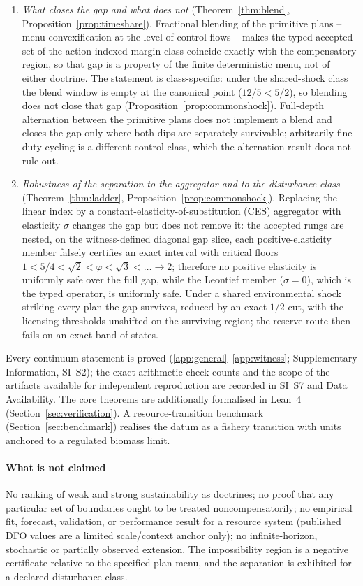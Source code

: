 \documentclass[preprint,11pt,authoryear]{elsarticle}
\theoremstyle{definition}
\theoremstyle{remark}
\begin{document}
\begin{enumerate}[leftmargin=2em,label=(\roman*)]
\item \emph{What closes the gap and what does not} (Theorem~\ref{thm:blend}, Proposition~\ref{prop:timeshare}). Fractional blending of the primitive plans -- menu convexification at the level of control flows -- makes the typed accepted set of the action-indexed margin class coincide exactly with the compensatory region, so that gap is a property of the finite deterministic menu, not of either doctrine. The statement is class-specific: under the shared-shock class the blend window is empty at the canonical point ($12/5<5/2$), so blending does not close that gap (Proposition~\ref{prop:commonshock}). Full-depth alternation between the primitive plans does not implement a blend and closes the gap only where both dips are separately survivable; arbitrarily fine duty cycling is a different control class, which the alternation result does not rule out.
\item \emph{Robustness of the separation to the aggregator and to the disturbance class} (Theorem~\ref{thm:ladder}, Proposition~\ref{prop:commonshock}). Replacing the linear index by a constant-elasticity-of-substitution (CES) aggregator with elasticity $\sigma$ changes the gap but does not remove it: the accepted rungs are nested, on the witness-defined diagonal gap slice, each positive-elasticity member falsely certifies an exact interval with critical floors $1<5/4<\sqrt2<\varphi<\sqrt3<\dots\to2$; therefore no positive elasticity is uniformly safe over the full gap, while the Leontief member ($\sigma=0$), which is the typed operator, is uniformly safe. Under a shared environmental shock striking every plan the gap survives, reduced by an exact $1/2$-cut, with the licensing thresholds unshifted on the surviving region; the reserve route then fails on an exact band of states.
\end{enumerate}
Every continuum statement is proved (\ref{app:general}--\ref{app:witness}; Supplementary Information, SI~S2); the exact-arithmetic check counts and the scope of the artifacts available for independent reproduction are recorded in SI~S7 and Data Availability. The core theorems are additionally formalised in Lean~4 (Section~\ref{sec:verification}). A resource-transition benchmark (Section~\ref{sec:benchmark}) realises the datum as a fishery transition with units anchored to a regulated biomass limit.

\paragraph{What is not claimed} No ranking of weak and strong sustainability as doctrines; no proof that any particular set of boundaries ought to be treated noncompensatorily; no empirical fit, forecast, validation, or performance result for a resource system (published DFO values are a limited scale/context anchor only); no infinite-horizon, stochastic or partially observed extension. The impossibility region is a negative certificate relative to the specified plan menu, and the separation is exhibited for a declared disturbance class.
\end{document}
